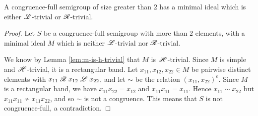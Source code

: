 \begin{lemma}
  \label{lem:m-is-l-or-r-trivial}
  A congruence-full semigroup of size greater than $2$ has a minimal ideal which
  is either $\mathrel{\mathscr{L}}$-trivial or $\mathrel{\mathscr{R}}$-trivial.
  \begin{proof}
    Let $S$ be a congruence-full semigroup with more than $2$ elements, with a
    minimal ideal $M$ which is neither $\mathrel{\mathscr{L}}$-trivial nor $\mathrel{\mathscr{R}}$-trivial.

    We know by Lemma \ref{lem:m-is-h-trivial} that $M$ is $\mathrel{\mathscr{H}}$-trivial.
    Since $M$ is simple and $\mathrel{\mathscr{H}}$-trivial, it is a rectangular band.  Let
    $x_{11}, x_{12}, x_{22} \in M$ be pairwise distinct elements with
    $x_{11} \mathrel{\mathscr{R}} x_{12} \mathrel{\mathscr{L}} x_{22}$, and let $\sim$ be the relation
    $(x_{11},x_{22})^e$.  Since $M$ is a rectangular band, we have
    $x_{11}x_{22} = x_{12}$ and $x_{11}x_{11} = x_{11}$.  Hence
    $x_{11} \sim x_{22}$ but $x_{11}x_{11} \nsim x_{11}x_{22}$, and so $\sim$ is
    not a congruence.  This means that $S$ is not congruence-full, a
    contradiction.
  \end{proof}
\end{lemma}

